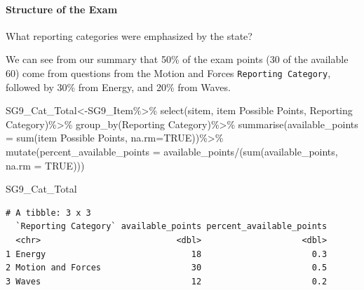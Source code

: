 \documentclass[
  letterpaper,
  DIV=11,
  numbers=noendperiod]{scrartcl}
\let\oldparagraph\paragraph
\renewcommand{\paragraph}[1]{\oldparagraph{#1}\mbox{}}
\newenvironment{Shaded}{\begin{snugshade}}{\end{snugshade}}
\newcommand{\AttributeTok}[1]{\textcolor[rgb]{0.40,0.45,0.13}{#1}}
\newcommand{\ConstantTok}[1]{\textcolor[rgb]{0.56,0.35,0.01}{#1}}
\newcommand{\FunctionTok}[1]{\textcolor[rgb]{0.28,0.35,0.67}{#1}}
\newcommand{\NormalTok}[1]{\textcolor[rgb]{0.00,0.23,0.31}{#1}}
\newcommand{\OtherTok}[1]{\textcolor[rgb]{0.00,0.23,0.31}{#1}}
\newcommand{\SpecialCharTok}[1]{\textcolor[rgb]{0.37,0.37,0.37}{#1}}
\newcommand{\StringTok}[1]{\textcolor[rgb]{0.13,0.47,0.30}{#1}}
\begin{document}
\hypertarget{structure-of-the-exam}{%
\paragraph{Structure of the Exam}\label{structure-of-the-exam}}

What reporting categories were emphasized by the state?

We can see from our summary that 50\% of the exam points (30 of the
available 60) come from questions from the Motion and Forces
\texttt{Reporting\ Category}, followed by 30\% from Energy, and 20\%
from Waves.

\begin{Shaded}
\begin{Highlighting}[]
\NormalTok{SG9\_Cat\_Total}\OtherTok{\textless{}{-}}\NormalTok{SG9\_Item}\SpecialCharTok{\%\textgreater{}\%}
  \FunctionTok{select}\NormalTok{(}\StringTok{\textasciigrave{}}\AttributeTok{sitem}\StringTok{\textasciigrave{}}\NormalTok{, }\StringTok{\textasciigrave{}}\AttributeTok{item Possible Points}\StringTok{\textasciigrave{}}\NormalTok{, }\StringTok{\textasciigrave{}}\AttributeTok{Reporting Category}\StringTok{\textasciigrave{}}\NormalTok{)}\SpecialCharTok{\%\textgreater{}\%}
  \FunctionTok{group\_by}\NormalTok{(}\StringTok{\textasciigrave{}}\AttributeTok{Reporting Category}\StringTok{\textasciigrave{}}\NormalTok{)}\SpecialCharTok{\%\textgreater{}\%}
  \FunctionTok{summarise}\NormalTok{(}\AttributeTok{available\_points =} \FunctionTok{sum}\NormalTok{(}\StringTok{\textasciigrave{}}\AttributeTok{item Possible Points}\StringTok{\textasciigrave{}}\NormalTok{, }\AttributeTok{na.rm=}\ConstantTok{TRUE}\NormalTok{))}\SpecialCharTok{\%\textgreater{}\%}
  \FunctionTok{mutate}\NormalTok{(}\AttributeTok{percent\_available\_points =}\NormalTok{ available\_points}\SpecialCharTok{/}\NormalTok{(}\FunctionTok{sum}\NormalTok{(available\_points, }\AttributeTok{na.rm =} \ConstantTok{TRUE}\NormalTok{)))}

\NormalTok{SG9\_Cat\_Total}
\end{Highlighting}
\end{Shaded}

\begin{verbatim}
# A tibble: 3 x 3
  `Reporting Category` available_points percent_available_points
  <chr>                           <dbl>                    <dbl>
1 Energy                             18                      0.3
2 Motion and Forces                  30                      0.5
3 Waves                              12                      0.2
\end{verbatim}
\end{document}
